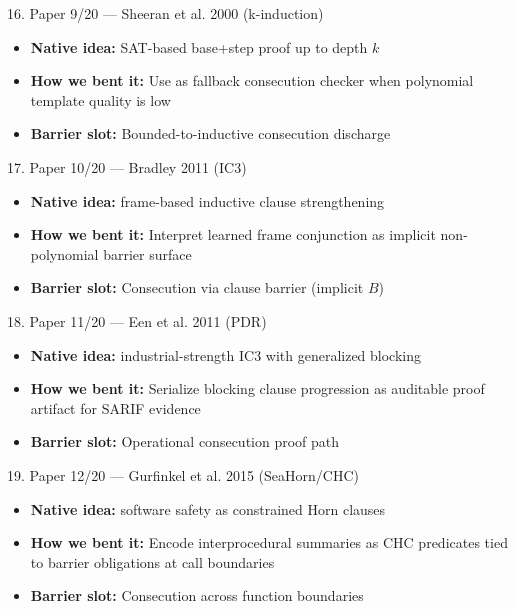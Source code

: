 \documentclass[aspectratio=169]{beamer}
\newcommand{\bendtag}[1]{\textcolor{blue!70!black}{\textbf{How we bent it:} #1}}
\newcommand{\slottag}[1]{\textcolor{teal!70!black}{\textbf{Barrier slot:} #1}}
\begin{document}
\begin{frame}[t,shrink=8]{16. Paper 9/20 — Sheeran et al. 2000 (k-induction)}
\begin{itemize}
  \item \textbf{Native idea:} SAT-based base+step proof up to depth \(k\)
  \item \bendtag{Use as fallback consecution checker when polynomial template quality is low}
  \item \slottag{Bounded-to-inductive consecution discharge}
\end{itemize}
\end{frame}

\begin{frame}[t,shrink=8]{17. Paper 10/20 — Bradley 2011 (IC3)}
\begin{itemize}
  \item \textbf{Native idea:} frame-based inductive clause strengthening
  \item \bendtag{Interpret learned frame conjunction as implicit non-polynomial barrier surface}
  \item \slottag{Consecution via clause barrier (implicit \(B\))}
\end{itemize}
\end{frame}

\begin{frame}[t,shrink=8]{18. Paper 11/20 — Een et al. 2011 (PDR)}
\begin{itemize}
  \item \textbf{Native idea:} industrial-strength IC3 with generalized blocking
  \item \bendtag{Serialize blocking clause progression as auditable proof artifact for SARIF evidence}
  \item \slottag{Operational consecution proof path}
\end{itemize}
\end{frame}

\begin{frame}[t,shrink=8]{19. Paper 12/20 — Gurfinkel et al. 2015 (SeaHorn/CHC)}
\begin{itemize}
  \item \textbf{Native idea:} software safety as constrained Horn clauses
  \item \bendtag{Encode interprocedural summaries as CHC predicates tied to barrier obligations at call boundaries}
  \item \slottag{Consecution across function boundaries}
\end{itemize}
\end{frame}
\end{document}
